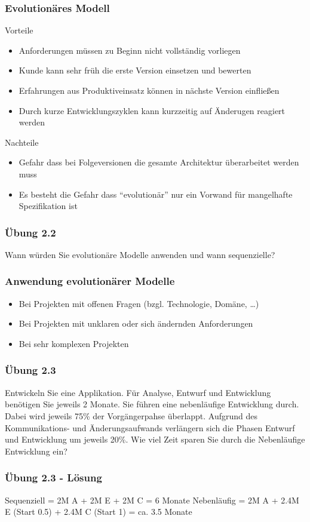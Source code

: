 \begin{frame}
\frametitle{Evolutionäres Modell}
	Vorteile
	\begin{itemize}
		\item Anforderungen müssen zu Beginn nicht vollständig vorliegen
		\item Kunde kann sehr früh die erste Version einsetzen und bewerten
		\item Erfahrungen aus Produktiveinsatz können in nächste Version einfließen
		\item Durch kurze Entwicklungszyklen kann kurzzeitig auf Änderugen reagiert werden
	\end{itemize}
	\bigskip
	Nachteile
	\begin{itemize}
		\item Gefahr dass bei Folgeversionen die gesamte Architektur überarbeitet werden muss
		\item Es besteht die Gefahr dass ``evolutionär'' nur ein Vorwand für mangelhafte 
		Spezifikation ist
	\end{itemize}
\end{frame}

\begin{frame}
\frametitle{Übung 2.2}
	Wann würden Sie evolutionäre Modelle anwenden und wann sequenzielle?
\end{frame}

\begin{frame}
\frametitle{Anwendung evolutionärer Modelle}
	\begin{itemize}
		\item Bei Projekten mit offenen Fragen (bzgl. Technologie, Domäne, \ldots)
		\item Bei Projekten mit unklaren oder sich ändernden Anforderungen
		\item Bei sehr komplexen Projekten
	\end{itemize}
\end{frame}

\begin{frame}
\frametitle{Übung 2.3}
	Entwickeln Sie eine Applikation. Für Analyse, Entwurf und Entwicklung benötigen 
	Sie jeweils 2 Monate. Sie führen eine nebenläufige Entwicklung durch. Dabei wird
	jeweils 75\% der Vorgängerpahse überlappt. Aufgrund des Kommunikations- und 
	Änderungsaufwands verlängern sich die Phasen Entwurf und Entwicklung um jeweils 20\%.
	Wie viel Zeit sparen Sie durch die Nebenläufige Entwicklung ein?
\end{frame}

\ifloesung
\begin{frame}
\frametitle{Übung 2.3 - Lösung}
	Sequenziell = 2M A + 2M E + 2M C = 6 Monate
	\newline
	Nebenläufig = 2M A + 2.4M E (Start 0.5) + 2.4M C (Start 1) = ca. 3.5 Monate	
\end{frame}
\fi

